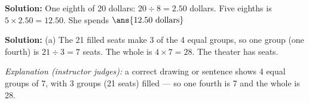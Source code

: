 \documentclass[12pt]{article}
\begin{document}

\textbf{Solution:} One eighth of 20 dollars: $20 \div 8 = 2.50$ dollars.
Five eighths is $5 \times 2.50 = 12.50$. She spends
$\ans{12.50\ \text{dollars}}$


\textbf{Solution:} (a) The 21 filled seats make 3 of the 4 equal groups, so
one group (one fourth) is $21 \div 3 = 7$ seats. The whole is
$4 \times 7 = 28$. The theater has  seats.

\emph{Explanation (instructor judges):} a correct drawing or sentence shows
4 equal groups of 7, with 3 groups (21 seats) filled --- so one fourth is 7
and the whole is 28.
\end{document}
